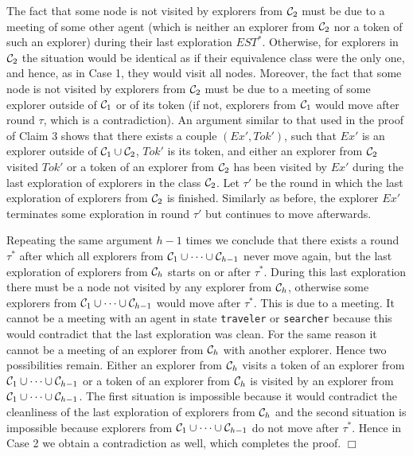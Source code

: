 \documentclass[11pt]{article}
\newcommand{\qed}{\hfill $\Box$ \bigbreak}
\newenvironment{proof}{\noindent {\bf Proof.}}{\qed}
\newcommand{\cC}{{\cal C}}
\begin{document}
\begin{proof}
The fact that some node is not visited by explorers from $\cC_2$ must be due to a meeting of some other agent
(which is neither an explorer from  $\cC_2$ nor a token of such an explorer) during their last exploration $EST^*$.
Otherwise, for explorers in $\cC_2$ the situation would be identical as if their equivalence class were the only one, and hence, as in Case 1, 
they would visit all nodes. Moreover, the fact that some node is not visited by explorers from $\cC_2$ must be due to a meeting of some explorer outside of $\cC_1$
or of its token (if not, explorers from $\cC_1$ would move after round $\tau$, which is a contradiction). 
An argument similar to that used in the proof of {Claim 3} shows that there exists a couple $(Ex',Tok')$, such that $Ex'$ is an explorer outside of  $\cC_1 \cup \cC_2$,
$Tok'$ is its token, and 
either an explorer from $\cC_2$ visited $Tok'$ or a token of an explorer
from $\cC_2$ has been visited by $Ex'$ during the last exploration of explorers in the class $\cC_2$.
Let $\tau'$ be the round in which the last exploration of explorers from $\cC_2$ is finished.
Similarly as before, the explorer $Ex'$ terminates some exploration in round $\tau'$ but continues to move afterwards.

Repeating the same argument $h-1$ times we conclude that there exists a round $\tau^*$
after which all explorers from $\cC_1 \cup \cdots \cup \cC_{h-1}$ never move again, but the last exploration of explorers from 
 $\cC_h$ starts on or after $\tau^*$. During this last exploration there must be a node not visited by any explorer from $\cC_h$, 
 otherwise some explorers from $\cC_1 \cup \cdots \cup \cC_{h-1}$ would move after $\tau^*$.
 This is due to a meeting. It cannot be a meeting with an agent in state {\tt traveler} or {\tt searcher} because this would contradict that the last exploration
was clean. For the same reason it cannot be a meeting of an explorer from $\cC_h$ with another explorer. Hence two possibilities remain.
Either an explorer from $\cC_h$ visits a token of an explorer from $\cC_1 \cup \cdots \cup \cC_{h-1}$ or a token of an explorer from $\cC_h$ is visited
by an explorer from $\cC_1 \cup \cdots \cup \cC_{h-1}$. The first situation is impossible because it would contradict the cleanliness of the last exploration
of explorers from $\cC_h$ and the second situation is impossible because explorers from $\cC_1 \cup \cdots \cup \cC_{h-1}$ do not move after $\tau^*$.
Hence in Case 2 we obtain a contradiction as well, which completes the proof.
    \end{proof}
    
\end{document}
